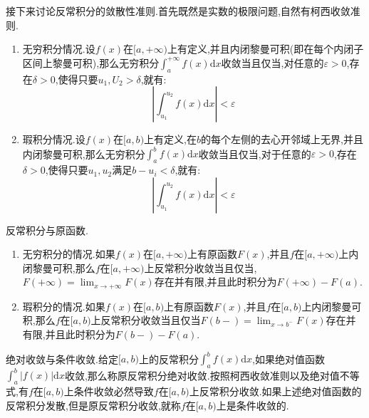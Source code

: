 接下来讨论反常积分的敛散性准则.首先既然是实数的极限问题,自然有柯西收敛准则.
\begin{enumerate}
	\item 无穷积分情况.设$f(x)$在$[a,+\infty)$上有定义,并且内闭黎曼可积(即在每个内闭子区间上黎曼可积),那么无穷积分$\int_a^{+\infty}f(x)\mathrm{d}x$收敛当且仅当,对任意的$\varepsilon>0$,存在$\delta>0$,使得只要$u_1,U_2>\delta$,就有:
	$$\left|\int_{u_1}^{u_2}f(x)\mathrm{d}x\right|<\varepsilon$$
	\item 瑕积分情况.设$f(x)$在$[a,b)$上有定义,在$b$的每个左侧的去心开邻域上无界,并且内闭黎曼可积,那么无穷积分$\int_a^bf(x)\mathrm{d}x$收敛当且仅当,对于任意的$\varepsilon>0$,存在$\delta>0$,使得只要$u_1,u_2$满足$b-u_i<\delta$,就有:
	$$\left|\int_{u_1}^{u_2}f(x)\mathrm{d}x\right|<\varepsilon$$
\end{enumerate}

反常积分与原函数.
\begin{enumerate}
	\item 无穷积分的情况.如果$f(x)$在$[a,+\infty)$上有原函数$F(x)$,并且$f$在$[a,+\infty)$上内闭黎曼可积,那么$f$在$[a,+\infty)$上反常积分收敛当且仅当,$F(+\infty)=\lim_{x\to+\infty}F(x)$存在并有限,并且此时积分为$F(+\infty)-F(a)$.
	\item 瑕积分的情况.如果$f(x)$在$[a,b)$上有原函数$F(x)$,并且$f$在$[a,b)$上内闭黎曼可积,那么$f$在$[a,b)$上反常积分收敛当且仅当$F(b-)=\lim_{x\to b^-}F(x)$存在并有限,并且此时积分为$F(b-)-F(a)$.
\end{enumerate}

绝对收敛与条件收敛.给定$[a,b)$上的反常积分$\int_a^bf(x)\mathrm{d}x$,如果绝对值函数$\int_a^b|f(x)|\mathrm{d}x$收敛,那么称原反常积分绝对收敛.按照柯西收敛准则以及绝对值不等式,有$f$在$[a,b)$上条件收敛必然导致$f$在$[a,b)$上反常积分收敛.如果上述绝对值函数的反常积分发散,但是原反常积分收敛,就称$f$在$[a,b)$上是条件收敛的.

